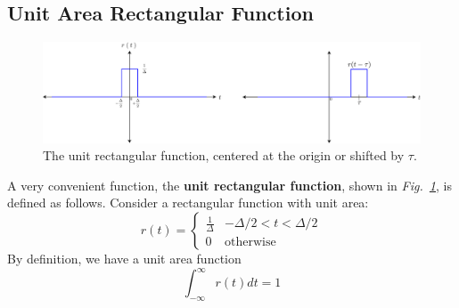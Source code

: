 \subsection{Unit Area Rectangular Function}
\begin{figure}[tb]
\centering
\includegraphics[width=1\columnwidth]{rect_func}
\caption{The unit rectangular function, centered at the origin or shifted by $\tau$. }
\label{fig:fun_rect}
\end{figure}
A very convenient function, the \textbf{unit rectangular function}, shown in \emph{Fig.~\ref{fig:fun_rect}}, is defined as follows.  Consider a rectangular function with unit area:
    \begin{equation}
        r(t) = \left\{ 
        \begin{array}{cc} 
        \frac{1}{\Delta} & -\Delta/2 < t < \Delta/2 \\ 
        0  & \mathrm{otherwise} 
        \end{array} \right.
    \end{equation}
 By definition, we have a unit area function
    \begin{equation}
        \int_{-\infty}^{\infty} r(t) dt = 1
    \end{equation}
